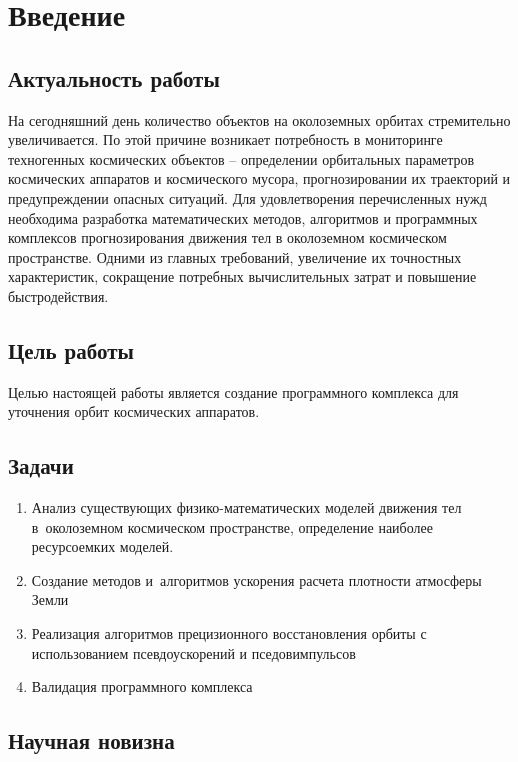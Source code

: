 \section{Введение}
\label{sec:Chapter0} 

\subsection*{Актуальность работы}

На сегодняшний день количество объектов на околоземных орбитах стремительно увеличивается. 
По этой причине возникает потребность в мониторинге техногенных космических объектов – 
определении орбитальных параметров космических аппаратов и космического мусора, 
прогнозировании их траекторий и предупреждении опасных ситуаций.
Для удовлетворения перечисленных нужд необходима разработка математических методов, 
алгоритмов и программных комплексов прогнозирования движения тел в околоземном космическом 
пространстве. Одними из главных требований, увеличение их точностных характеристик, 
сокращение потребных вычислительных затрат и повышение быстродействия.

\subsection*{Цель работы}

Целью настоящей работы является создание программного комплекса для уточнения орбит 
космических аппаратов.

\subsection*{Задачи}

\begin{enumerate}
    \item Анализ существующих физико-математических моделей движения тел 
    в околоземном космическом пространстве, определение наиболее ресурсоемких моделей.
    \item Создание методов и алгоритмов ускорения расчета плотности атмосферы Земли
    \item Реализация алгоритмов прецизионного восстановления орбиты с использованием
    псевдоускорений и пседовимпульсов
    \item Валидация программного комплекса
\end{enumerate}

\subsection*{Научная новизна}

